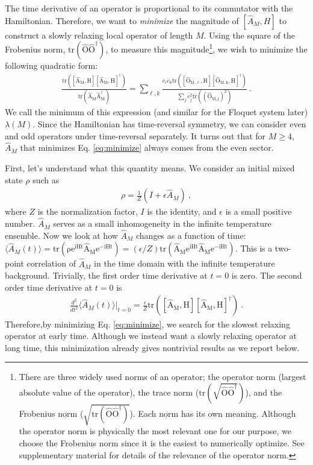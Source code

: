 \documentclass[twocolumn,superscriptaddress, prb]{revtex4-1}
\begin{document}
The time derivative of an operator is proportional to its commutator with the Hamiltonian.
Therefore, we want to {\it minimize} the magnitude of $[\hat{A}_M, H]$
to construct a slowly relaxing local operator of length $M$.
Using the square of the Frobenius norm, $\mathrm{tr(\hat{O}\hat{O}^\dag)}$, to measure this magnitude\footnote{There are three widely used norms of an operator;
the operator norm (largest absolute value of the operator), the trace norm ($\mathrm{tr(\sqrt{\hat{O}\hat{O}^\dag})}$),
and the Frobenius norm ($\sqrt{\mathrm{tr(\hat{O}\hat{O}^\dag)}}$). Each norm has its own meaning.
Although the operator norm is physically the most relevant one for our purpose,
we choose the Frobenius norm since it is the easiest to numerically optimize.
See supplementary material for details of the relevance of the operator norm.},
we wish to minimize the following quadratic form:
\begin{align}\label{eq:minimize}
\frac{\mathrm{tr([\hat{A}_M,H][\hat{A}_M,H]^\dag)}}{\mathrm{tr(\hat{A}_M\hat{A}^\dag_M)}} = \sum_{\ell,k}\frac{c_\ell c_k \mathrm{tr([\hat{O}_{M,\ell},H][\hat{O}_{M,k},H]^\dag)}}{\sum_j c_j ^2 \mathrm{tr((\hat{O}_{M,j})^2)}} ~.
\end{align}
We call the minimum of this expression (and similar for the Floquet system later) $\lambda(M)$.
Since the Hamiltonian has time-reversal symmetry,
we can consider even and odd operators under time-reversal separately.
It turns out that for $M\geq 4$, $\hat{A}_M$ that minimizes Eq. \eqref{eq:minimize} always comes from the even sector.

First, let's understand what this quantity means.
We consider an initial mixed state $\rho$ such as
\begin{align}\label{eq:initial}
\rho = \frac{1}{Z}\left(I + \epsilon \hat{A}_M\right) ~,
\end{align}
where $Z$ is the normalization factor, $I$ is the identity, and $\epsilon$ is a small positive number.
$\hat{A}_M$ serves as a small inhomogeneity in the infinite temperature ensemble.
Now we look at how $\hat{A}_M$ changes as a function of time:
$\langle \hat{A}_M(t) \rangle = \mathrm{tr(\rho e^{iHt} \hat{A}_M e^{-iHt})} = (\epsilon/Z)\mathrm{tr(\hat{A}_M e^{iHt} \hat{A}_M e^{-iHt})}$.
This is a two-point correlation of $\hat{A}_M$ in the time domain with the infinite temperature background.
Trivially, the first order time derivative at $t = 0$ is zero. The second order time derivative at $t = 0$ is
\begin{align}
\frac{d^2}{dt^2}\langle \hat{A}_M(t)\rangle\bigg|_{t=0} = \frac{\epsilon}{Z}\mathrm{tr([\hat{A}_M,H][\hat{A}_M,H]^\dag)} ~.
\end{align}
Therefore,by minimizing Eq. \eqref{eq:minimize},
we search for the slowest relaxing operator at early time.
Although we instead want a slowly relaxing operator at long time,
this minimization already gives nontrivial results as we report below.
\end{document}
